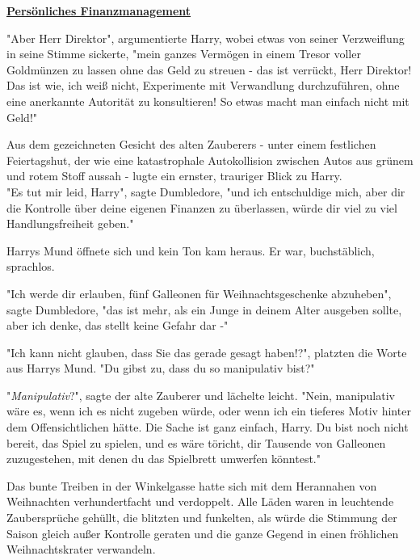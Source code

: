 

\hypertarget{persuxf6nliches-finanzmanagement}{%

\textbf{\uline{Persönliches Finanzmanagement}}

"Aber Herr Direktor", argumentierte Harry, wobei etwas von seiner Verzweiflung in seine Stimme sickerte, "mein ganzes Vermögen in einem Tresor voller Goldmünzen zu lassen ohne das Geld zu streuen - das ist verrückt, Herr Direktor!\\ Das ist wie, ich weiß nicht, Experimente mit Verwandlung durchzuführen, ohne eine anerkannte Autorität zu konsultieren! So etwas macht man einfach nicht mit Geld!"

Aus dem gezeichneten Gesicht des alten Zauberers - unter einem festlichen Feiertagshut, der wie eine katastrophale Autokollision zwischen Autos aus grünem und rotem Stoff aussah - lugte ein ernster, trauriger Blick zu Harry.\\ "Es tut mir leid, Harry", sagte Dumbledore, "und ich entschuldige mich, aber dir die Kontrolle über deine eigenen Finanzen zu überlassen, würde dir viel zu viel Handlungsfreiheit geben."

Harrys Mund öffnete sich und kein Ton kam heraus. Er war, buchstäblich, sprachlos.

"Ich werde dir erlauben, fünf Galleonen für Weihnachtsgeschenke abzuheben", sagte Dumbledore, "das ist mehr, als ein Junge in deinem Alter ausgeben sollte, aber ich denke, das stellt keine Gefahr dar -"

"Ich kann nicht glauben, dass Sie das gerade gesagt haben!?", platzten die Worte aus Harrys Mund. "Du gibst zu, dass du so manipulativ bist?"

"\emph{Manipulativ}?", sagte der alte Zauberer und lächelte leicht. "Nein, manipulativ wäre es, wenn ich es nicht zugeben würde, oder wenn ich ein tieferes Motiv hinter dem Offensichtlichen hätte. Die Sache ist ganz einfach, Harry. Du bist noch nicht bereit, das Spiel zu spielen, und es wäre töricht, dir Tausende von Galleonen zuzugestehen, mit denen du das Spielbrett umwerfen könntest."

Das bunte Treiben in der Winkelgasse hatte sich mit dem Herannahen von Weihnachten verhundertfacht und verdoppelt. Alle Läden waren in leuchtende Zaubersprüche gehüllt, die blitzten und funkelten, als würde die Stimmung der Saison gleich außer Kontrolle geraten und die ganze Gegend in einen fröhlichen Weihnachtskrater verwandeln.

}
